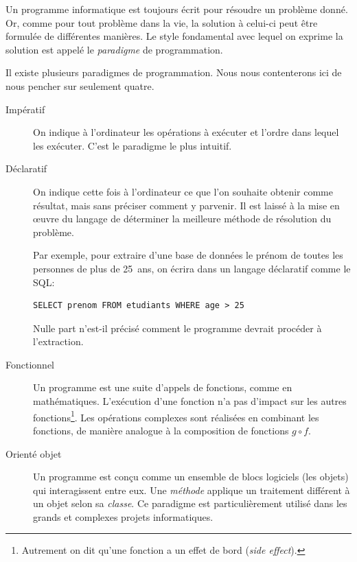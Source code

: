 Un programme informatique est toujours écrit pour résoudre un problème
donné. Or, comme pour tout problème dans la vie, la solution à
celui-ci peut être formulée de différentes manières. Le style
fondamental avec lequel on exprime la solution est appelé le
\emph{paradigme} de programmation.

Il existe plusieurs paradigmes de programmation. Nous nous
contenterons ici de nous pencher sur seulement quatre.

\begin{description}
\item[Impératif]  On indique à l'ordinateur
  les opérations à exécuter et l'ordre dans lequel les exécuter. C'est
  le paradigme le plus intuitif.
\item[Déclaratif]  On indique cette fois à
  l'ordinateur ce que l'on souhaite obtenir comme résultat, mais sans
  préciser comment y parvenir. Il est laissé à la mise en œuvre du
  langage de déterminer la meilleure méthode de résolution du
  problème.

  Par exemple, pour extraire d'une base de données  le
  prénom de toutes les personnes de plus de 25~ans, on écrira dans un
  langage déclaratif comme le SQL:
\begin{Schunk}
\begin{Verbatim}
SELECT prenom FROM etudiants WHERE age > 25
\end{Verbatim}
\end{Schunk}
  Nulle part n'est-il précisé comment le programme devrait procéder à
  l'extraction.
\item[Fonctionnel]  Un programme est une
  suite d'appels de fonctions, comme en mathématiques. L'exécution
  d'une fonction n'a pas d'impact sur les autres fonctions\footnote{%
    Autrement on dit qu'une fonction a un effet de bord (\emph{side
      effect}).}. %
  Les opérations complexes sont réalisées en combinant les fonctions,
  de manière analogue à la composition de fonctions $g \circ f$.
\item[Orienté objet]  Un programme est
  conçu comme un ensemble de blocs logiciels (les objets) qui
  interagissent entre eux. Une \emph{méthode} applique un traitement
  différent à un objet selon sa \emph{classe}. Ce paradigme est
  particulièrement utilisé dans les grands et complexes projets
  informatiques.
\end{description}

